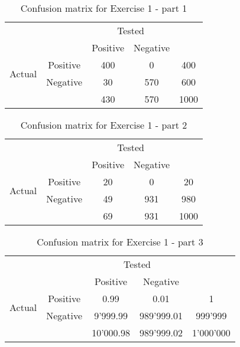 \documentclass[fontsize=12pt, usenames, dvipsnames, headinclude, headsepline, footinclude, footsepline]{scrartcl}
\begin{document}
\begin{table}[h]
\centering
\caption{Confusion matrix for Exercise 1 \-- part 1}
\label{Table:conf-matrix-ex1}
\begin{tabular}{cc|c|c|c}
                                             &          & \multicolumn{2}{c|}{Tested} &     \\ \cline{3-4}
                                             &          & Positive     & Negative     &     \\ \hline
\multicolumn{1}{c|}{\multirow{2}{*}{Actual}} & Positive & 400          & 0            & 400 \\ \cline{2-5} 
\multicolumn{1}{c|}{}                        & Negative & 30           & 570          & 600 \\ \hline
                                             &          & 430          & 570          & 1000  
\end{tabular}
\end{table}



\begin{table}[h]
\centering
\caption{Confusion matrix for Exercise 1 \-- part 2}
\label{Table:conf-matrix-ex1-2}
\begin{tabular}{cc|c|c|c}
                                             &          & \multicolumn{2}{c|}{Tested} &     \\ \cline{3-4}
                                             &          & Positive     & Negative     &     \\ \hline
\multicolumn{1}{c|}{\multirow{2}{*}{Actual}} & Positive & 20           & 0            & 20 \\ \cline{2-5} 
\multicolumn{1}{c|}{}                        & Negative & 49           & 931          & 980 \\ \hline
                                             &          & 69           & 931          & 1000  
\end{tabular}
\end{table}


\begin{table}[h]
\centering
\caption{Confusion matrix for Exercise 1 \-- part 3}
\label{Table:conf-matrix-ex1-3}
\begin{tabular}{cc|c|c|c}
                                             &          & \multicolumn{2}{c|}{Tested} &     \\ \cline{3-4}
                                             &          & Positive     & Negative     &     \\ \hline
\multicolumn{1}{c|}{\multirow{2}{*}{Actual}} & Positive & 0.99         & 0.01         & 1 \\ \cline{2-5} 
\multicolumn{1}{c|}{}                        & Negative & 9'999.99     & 989'999.01   & 999'999 \\ \hline
                                             &          & 10'000.98    & 989'999.02   & 1'000'000  
\end{tabular}
\end{table}
\end{document}
